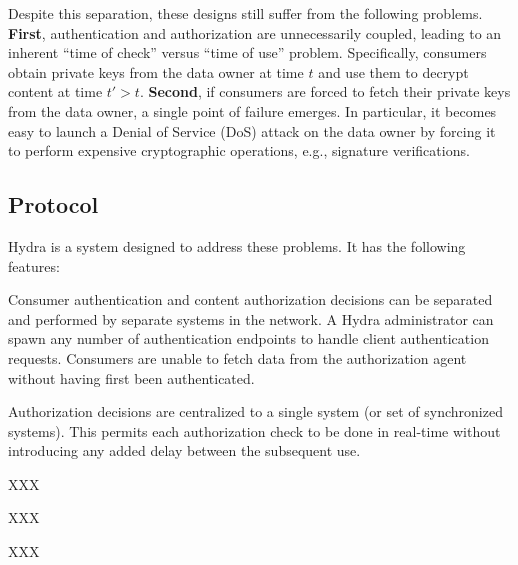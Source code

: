 Despite this separation, these designs still suffer from the following problems.
{\bf First}, authentication and authorization are unnecessarily coupled, leading
to an inherent ``time of check'' versus ``time of use'' problem. Specifically,
consumers obtain private keys from the data owner at time $t$ and use them to
decrypt content at time $t' > t$. {\bf Second}, if consumers are forced to fetch
their private keys from the data owner, a single point of failure emerges. In
particular, it becomes easy to launch a Denial of Service (DoS) attack on the
data owner by forcing it to perform expensive cryptographic operations, e.g.,
signature verifications.

\subsection{Protocol}

Hydra is a system designed to address these problems. It has the following features:
%
\begin{compactitem}
    \item Consumer authentication and content authorization decisions can be separated
    and performed by separate systems in the network. A Hydra administrator can spawn
    any number of authentication endpoints to handle client authentication requests.
    Consumers are unable to fetch data from the authorization agent without having
    first been authenticated.
    \item Authorization decisions are centralized to a single system (or set of synchronized
    systems). This permits each authorization check to be done in real-time without
    introducing any added delay between the subsequent use.
    \item XXX
    \item XXX
    \item XXX
\end{compactitem}
%

